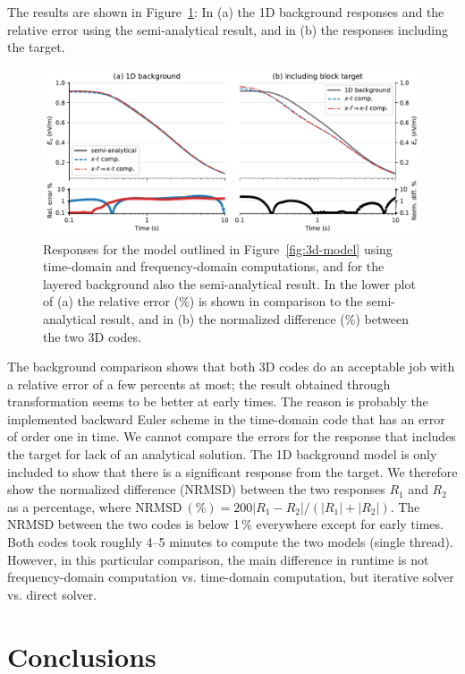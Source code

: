 \documentclass[extra, camera,%
    onecolumn,   %
    referee,     %
]{gji}
\newlength{\fwidth}
\newcommand{\mr}[1]{\mathrm{#1}}
\begin{document}
The results are shown in Figure~\ref{fig:3d-result}: In (a) the 1D background
responses and the relative error using the semi-analytical result, and in (b)
the responses including the target.
%
\begin{figure}
  \centering
  \includegraphics[width=\fwidth]{10-3d-result}
  \caption{Responses for the model outlined in Figure~\ref{fig:3d-model} using
    time-domain and frequency-domain computations, and for the layered
    background also the semi-analytical result. In the lower plot of (a) the
    relative error (\%) is shown in comparison to the semi-analytical result,
    and in (b) the normalized difference (\%) between the two 3D codes.
    }
  \label{fig:3d-result}
\end{figure}
%
The background comparison shows that both 3D codes do an acceptable job with a
relative error of a few percents at most; the result obtained through
transformation seems to be better at early times. The reason is probably the
implemented backward Euler scheme in the time-domain code that has an error of
order one in time. We cannot compare the errors for the response that includes
the target for lack of an analytical solution. The 1D background model is only
included to show that there is a significant response from the target. We
therefore show the normalized difference (NRMSD) between the two responses
$R_1$ and $R_2$ as a percentage, where $\mr{NRMSD~(\%)} = 200|R_1 - R_2|/(|R_1|
+ |R_2|)$. The NRMSD between the two codes is below 1\,\% everywhere except for
early times. Both codes took roughly 4--5 minutes to compute the two models
(single thread). However, in this particular comparison, the main difference in
runtime is not frequency-domain computation vs. time-domain computation, but
iterative solver vs. direct solver.


\section{Conclusions} %
\end{document}
